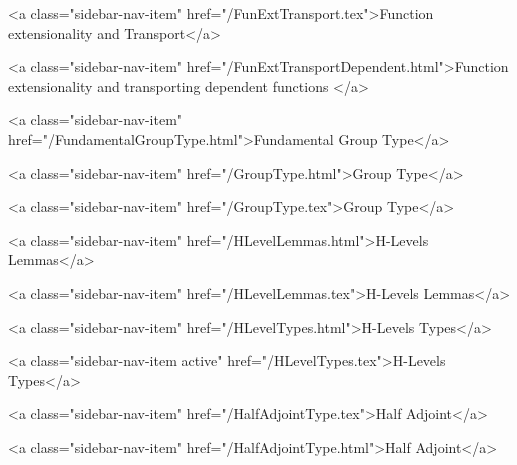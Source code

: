       
    
      
        
          <a class="sidebar-nav-item" href="/FunExtTransport.tex">Function extensionality and Transport</a>
        
      
    
      
        
          <a class="sidebar-nav-item" href="/FunExtTransportDependent.html">Function extensionality and transporting dependent functions </a>
        
      
    
      
        
          <a class="sidebar-nav-item" href="/FundamentalGroupType.html">Fundamental Group Type</a>
        
      
    
      
        
          <a class="sidebar-nav-item" href="/GroupType.html">Group Type</a>
        
      
    
      
        
          <a class="sidebar-nav-item" href="/GroupType.tex">Group Type</a>
        
      
    
      
        
          <a class="sidebar-nav-item" href="/HLevelLemmas.html">H-Levels Lemmas</a>
        
      
    
      
        
          <a class="sidebar-nav-item" href="/HLevelLemmas.tex">H-Levels Lemmas</a>
        
      
    
      
        
          <a class="sidebar-nav-item" href="/HLevelTypes.html">H-Levels Types</a>
        
      
    
      
        
          <a class="sidebar-nav-item active" href="/HLevelTypes.tex">H-Levels Types</a>
        
      
    
      
        
          <a class="sidebar-nav-item" href="/HalfAdjointType.tex">Half Adjoint</a>
        
      
    
      
        
          <a class="sidebar-nav-item" href="/HalfAdjointType.html">Half Adjoint</a>
        
